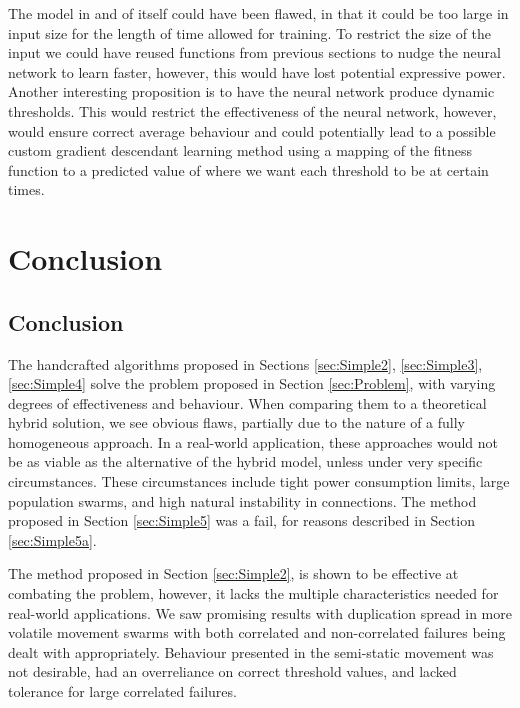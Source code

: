 \documentclass{UoYCSproject}
\begin{document}
The model in and of itself could have been flawed, in that it could be too large in input size for the length of time allowed for training.
To restrict the size of the input we could have reused functions from previous sections to nudge the neural network to learn faster, however, this would have lost potential expressive power.
Another interesting proposition is to have the neural network produce dynamic thresholds.
This would restrict the effectiveness of the neural network, however, would ensure correct average behaviour and could potentially lead to a possible custom gradient descendant learning method using a mapping of the fitness function to a predicted value of where we want each threshold to be at certain times.





\chapter{Conclusion}
\label{cha:conclusion}

\section{Conclusion}
\label{sec:conc}

The handcrafted algorithms proposed in Sections \ref{sec:Simple2}, \ref{sec:Simple3}, \ref{sec:Simple4} solve the problem proposed in Section \ref{sec:Problem}, with varying degrees of effectiveness and behaviour.
When comparing them to a theoretical hybrid solution, we see obvious flaws, partially due to the nature of a fully homogeneous approach.
In a real-world application, these approaches would not be as viable as the alternative of the hybrid model, unless under very specific circumstances.
These circumstances include tight power consumption limits, large population swarms, and high natural instability in connections.
The method proposed in Section \ref{sec:Simple5} was a fail, for reasons described in Section \ref{sec:Simple5a}.

The method proposed in Section \ref{sec:Simple2}, is shown to be effective at combating the problem, however, it lacks the multiple characteristics needed for real-world applications.
We saw promising results with duplication spread in more volatile movement swarms with both correlated and non-correlated failures being dealt with appropriately.
Behaviour presented in the semi-static movement was not desirable, had an overreliance on correct threshold values, and lacked tolerance for large correlated failures.
\end{document}

